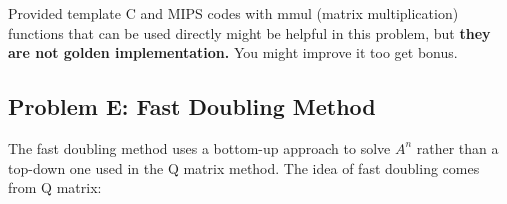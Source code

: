\documentclass{article}
\begin{document}
Provided template C and MIPS codes with mmul (matrix multiplication) functions that can be used directly might be helpful in this problem, but \textbf{they are not golden implementation.} You might improve it too get bonus.





\subsection{Problem E: Fast Doubling Method}
The fast doubling\cite{fast} method uses a bottom-up approach to solve $A^n$ rather than a top-down one used in the Q matrix method.
The idea of fast doubling comes from Q matrix:
\end{document}
